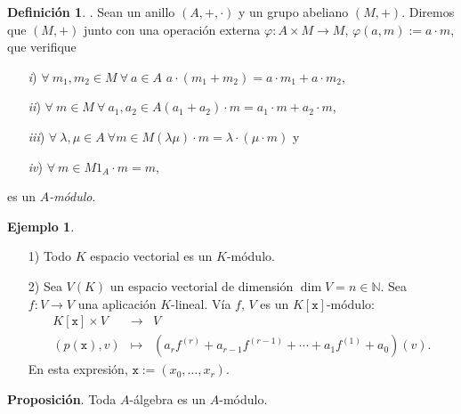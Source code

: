 \documentclass[a4paper,12pt]{article}
\newcommand{\N}{\mathbb{N}}
\newcommand{\x}{\texttt{x}}
\theoremstyle{definition}
\newtheorem{definition}[theorem]{Definición}
\newtheorem{example}[theorem]{Ejemplo}
\begin{document}
\begin{definition}. Sean un anillo $(A,+,\cdot)$ y un grupo abeliano $(M,+)$. 
Diremos que $(M,+)$ junto con una operación externa $\varphi: A\times M\longrightarrow M$, $\varphi(a,m):=a\cdot m$, que verifique
\begin{itemize}
    \item[\textit{i})] $\forall\ m_1,m_2\in M\ \forall\ a\in A$\hspace{15pt} $a\cdot(m_1+m_2)=a\cdot m_1+a\cdot m_2$,
    \item[\textit{ii})] $\forall\ m\in M\ \forall\ a_1,a_2\in A$\hspace{15pt}$(a_1+a_2)\cdot m=a_1\cdot m+a_2\cdot m$,
    \item[\textit{iii})]$\forall\ \lambda,\mu\in A\ \forall m\in M$\hspace{15pt}$(\lambda\mu)\cdot m=\lambda\cdot(\mu\cdot m)$ y
    \item[\textit{iv})]$\forall\ m\in M$\hspace{15pt}$1_A\cdot m=m$,
\end{itemize}es un \textit{$A$-módulo}.
\end{definition}

\begin{example}\begin{itemize}
    \item[1)] Todo $K$ espacio vectorial es un $K$-módulo.
    \item[2)] Sea $V(K)$ un espacio vectorial de dimensión $\dim V=n\in\N$. Sea $f: V\longrightarrow V$ una aplicación $K$-lineal. Vía $f$, $V$ es un $K[\x]$-módulo:$$\begin{array}{rcl}
    K[\x]\times V&\longrightarrow&V\\
    (p(\x),v)&\longmapsto&\left(a_rf^{(r)}+a_{r-1}f^{(r-1)}+\cdots+a_{1}f^{(1)}+a_0\right)(v).
    \end{array}$$
    En esta expresión, $\x:=(x_0,\dots,x_r)$.
\end{itemize}
\end{example}
\textbf{Proposición}. Toda $A$-álgebra es un $A$-módulo.
\end{document}

